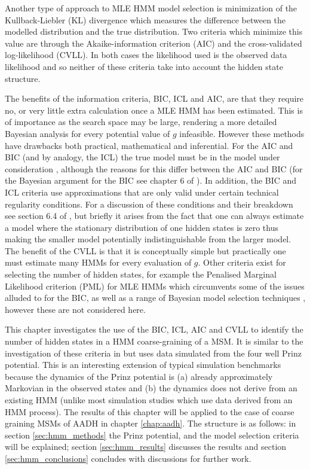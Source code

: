 Another type of approach to MLE HMM model selection is minimization of the Kullback-Liebler (KL) divergence \cite{kullbackInformationSufficiency1951} which  measures the difference between the modelled distribution and the true distribution. Two criteria which minimize this value are through the Akaike-information criterion (AIC) \cite{akaikeInformationTheoryExtension1998} and the cross-validated log-likelihood\cite{celeuxSelectingHiddenMarkov2008} (CVLL). In both cases the likelihood used is the observed data likelihood and so neither of these criteria take into account the hidden state structure.  

The benefits of the information criteria, BIC, ICL and AIC, are that they require no, or very little extra calculation once a MLE HMM has been estimated. This is of importance as the search space may be large, rendering a more detailed Bayesian analysis for every potential value of $g$ infeasible. However these methods have drawbacks both practical, mathematical and inferential. For the AIC and BIC (and by analogy, the ICL) the true model must be in the model under consideration \cite{ripley_1996}, although the reasons for this differ between the  AIC and BIC (for the Bayesian argument for the BIC see chapter 6 of \cite{bernardo2007bayesian}). In addition, the BIC and ICL criteria use approximations that are only valid under certain technical regularity conditions. For a discussion of these conditions and their breakdown see section 6.4 of \cite{mclachlanFiniteMixtureModels2000}, but briefly it arises from the fact that one can always estimate a model where the stationary distribution of one hidden states is zero thus making the smaller model potentially indistinguishable from the larger model. The benefit of the CVLL  is that it is conceptually simple but practically  one must estimate many HMMs for every evaluation of $g$. Other criteria exist for selecting the number of hidden states, for example the Penalised Marginal Likelihood criterion (PML) \cite{gassiatLikelihoodRatioInequalities2002} for MLE HMMs which circumvents some of the issues alluded to for the BIC, as well as a range of Bayesian model selection techniques \cite{gelmanBayesianDataAnalysis2014}\cite{bernardo2007bayesian}, however these are not considered here. 

This chapter investigates the use of the BIC, ICL, AIC and CVLL to identify the number of hidden states in a HMM coarse-graining of a MSM. It is similar to the investigation of these criteria in \cite{celeuxSelectingHiddenMarkov2008} but uses data simulated from the four well Prinz potential. This is an interesting extension of typical simulation benchmarks because the dynamics of the Prinz potential is (a) already approximately Markovian in the observed states and (b) the dynamics does not derive from an existing HMM (unlike most simulation studies which use data derived from an HMM process). The results of this chapter will be applied to the case of coarse graining MSMs of AADH in chapter \ref{chap:aadh}.  The structure is as follows: in section \ref{sec:hmm_methods} the Prinz potential, and the model selection criteria will be explained; section \ref{sec:hmm_results} discusses the results and section \ref{sec:hmm_conclusions} concludes with discussions for further work. 

